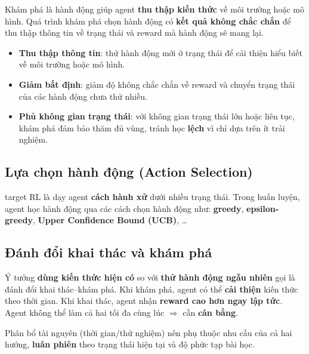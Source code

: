 \begin{dinhnghia}[title={Exploration}]
Khám phá là hành động giúp agent \textbf{thu thập kiến thức} về môi trường hoặc mô hình.
Quá trình khám phá chọn hành động có \textbf{kết quả không chắc chắn} để thu thập thông tin về trạng thái và reward mà hành động sẽ mang lại.
\end{dinhnghia}

\begin{tinhchat}[title={Các khía cạnh chính của khám phá}]
\begin{itemize}
  \item \textbf{Thu thập thông tin}: thử hành động mới ở trạng thái để cải thiện hiểu biết về môi trường hoặc mô hình.
  \item \textbf{Giảm bất định}: giảm độ không chắc chắn về reward và chuyển trạng thái của các hành động chưa thử nhiều.
  \item \textbf{Phủ không gian trạng thái}: với không gian trạng thái lớn hoặc liên tục, khám phá đảm bảo thăm đủ vùng, tránh học \textbf{lệch} vì chỉ dựa trên ít trải nghiệm.
\end{itemize}
\end{tinhchat}

\subsection{Lựa chọn hành động (Action Selection)}

\begin{phuongphap}[title={target huấn luyện agent}]
target RL là dạy agent \textbf{cách hành xử} dưới nhiều trạng thái.
Trong huấn luyện, agent học hành động qua các cách chọn hành động như: \textbf{greedy}, \textbf{epsilon-greedy}, \textbf{Upper Confidence Bound (UCB)}, \ldots
\end{phuongphap}

\subsection{Đánh đổi khai thác và khám phá}

\begin{ynghia}[title={Exploration vs.\ Exploitation trade-off}]
Ý tưởng \textbf{dùng kiến thức hiện có} so với \textbf{thử hành động ngẫu nhiên} gọi là đánh đổi khai thác--khám phá.
Khi khám phá, agent có thể \textbf{cải thiện} kiến thức theo thời gian.
Khi khai thác, agent nhận \textbf{reward cao hơn ngay lập tức}.
Agent không thể làm cả hai tối đa cùng lúc $\Rightarrow$ cần \textbf{cân bằng}.

Phân bổ tài nguyên (thời gian/thử nghiệm) nên phụ thuộc nhu cầu của cả hai hướng, \textbf{luân phiên} theo trạng thái hiện tại và độ phức tạp bài học.
\end{ynghia}

